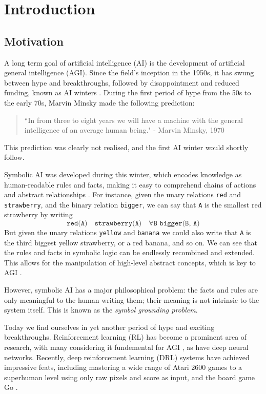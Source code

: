 \chapter{Introduction}

\section{Motivation}

A long term goal of artificial intelligence (AI) is the development of artificial general intelligence (AGI). Since the field's inception in the 1950s, it has swung between hype and breakthroughs, followed by disappointment and reduced funding, known as AI winters \cite{Knight2016}. During the first period of hype from the 50s to the early 70s, Marvin Minsky made the following prediction: \cite{Darrach}

\begin{quote} 
\centering 
``In from three to eight years we will have a machine with the general intelligence of an average human being." - Marvin Minsky, 1970
\end{quote}

This prediction was clearly not realised, and the first AI winter would shortly follow.

Symbolic AI was developed during this winter, which encodes knowledge as human-readable rules and facts, making it easy to comprehend chains of actions and abstract relationships \cite{Reingold2001}. For instance, given the unary relations \texttt{red} and \texttt{strawberry}, and the binary relation \texttt{bigger}, we can say that \texttt{A} is the smallest red strawberry by writing $$\texttt{red(A)} \quad \texttt{strawberry(A)} \quad \forall\texttt{B bigger(B, A)}$$ But given the unary relations \texttt{yellow} and \texttt{banana} we could also write that \texttt{A} is the third biggest yellow strawberry, or a red banana, and so on. We can see that the rules and facts in symbolic logic can be endlessly recombined and extended. This allows for the manipulation of high-level abstract concepts, which is key to AGI \cite{Garnelo2016}.

However, symbolic AI has a major philosophical problem: the facts and rules are only meaningful to the human writing them; their meaning is not intrinsic to the system itself. This is known as the \textit{symbol grounding problem}.

Today we find ourselves in yet another period of hype and exciting breakthroughs. Reinforcement learning (RL) has become a prominent area of research, with many considering it fundemental for AGI \cite{Hutter2005}, as have deep neural networks. Recently, deep reinforcement learning (DRL) systems have achieved impressive feats, including mastering a wide range of Atari 2600 games to a superhuman level using only raw pixels and score as input, and the board game Go \cite{Mnih2015, Silver2016}.\\

